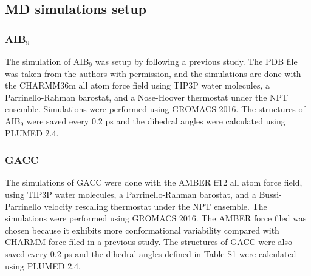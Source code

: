 \documentclass[9pt,twocolumn,twoside]{pnas-new}
\newcommand{\pt}{\textcolor{red}}
\begin{document}



\subsection*{MD simulations setup}
\label{sec:setup}
\subsubsection*{AIB$_9$}
The simulation of AIB$_9$ was setup by following a previous study\cite{SPIB_AIB9}. The PDB file was taken from the authors with permission, and the simulations are done with the CHARMM36m all atom force field \cite{charmm36m} using TIP3P water molecules\cite{tip3p}, a Parrinello-Rahman barostat\cite{Parrinello_Rahman_dynamics}, and a Nose-Hoover thermostat\cite{hoover, nose--hoover} under the NPT ensemble. Simulations were performed using GROMACS 2016.\cite{2016gromacs} The structures of AIB$_9$ were saved every 0.2 ps and the dihedral angles were calculated using PLUMED 2.4\cite{plumed}. 

\subsubsection*{GACC}
The simulations of GACC were done with the AMBER ff12 all atom force field, using TIP3P water molecules\cite{tip3p}, a Parrinello-Rahman barostat\cite{Parrinello_Rahman_dynamics}, and a Bussi-Parrinello velocity rescaling thermostat\cite{Bussi_Parrinello_thermostat} under the NPT ensemble. The simulations were performed using GROMACS 2016\cite{2016gromacs}. The AMBER force filed was chosen because it exhibits more conformational variability compared with CHARMM force filed in a previous study\cite{Bergonzo2015}. The structures of GACC were also saved every 0.2 ps and the dihedral angles defined in Table S1 were calculated using PLUMED 2.4\cite{plumed}.
\end{document}
